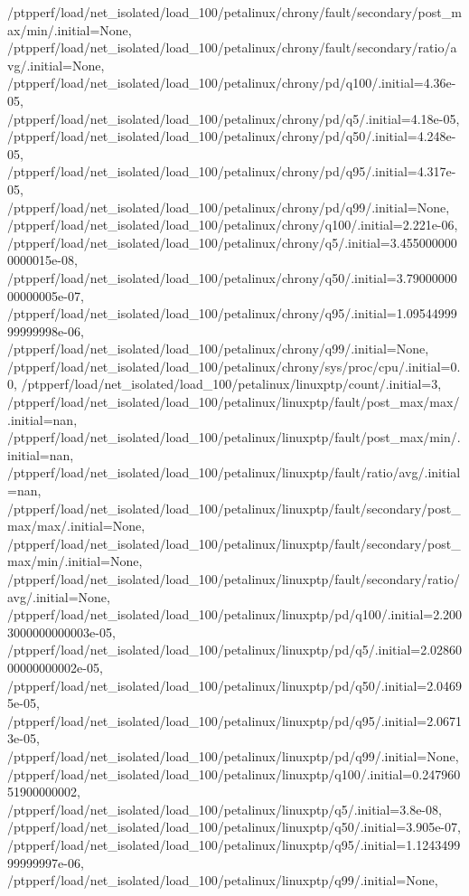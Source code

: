 {    /ptpperf/load/net_isolated/load_100/petalinux/chrony/fault/secondary/post_max/min/.initial=None,
    /ptpperf/load/net_isolated/load_100/petalinux/chrony/fault/secondary/ratio/avg/.initial=None,
    /ptpperf/load/net_isolated/load_100/petalinux/chrony/pd/q100/.initial=4.36e-05,
    /ptpperf/load/net_isolated/load_100/petalinux/chrony/pd/q5/.initial=4.18e-05,
    /ptpperf/load/net_isolated/load_100/petalinux/chrony/pd/q50/.initial=4.248e-05,
    /ptpperf/load/net_isolated/load_100/petalinux/chrony/pd/q95/.initial=4.317e-05,
    /ptpperf/load/net_isolated/load_100/petalinux/chrony/pd/q99/.initial=None,
    /ptpperf/load/net_isolated/load_100/petalinux/chrony/q100/.initial=2.221e-06,
    /ptpperf/load/net_isolated/load_100/petalinux/chrony/q5/.initial=3.4550000000000015e-08,
    /ptpperf/load/net_isolated/load_100/petalinux/chrony/q50/.initial=3.7900000000000005e-07,
    /ptpperf/load/net_isolated/load_100/petalinux/chrony/q95/.initial=1.0954499999999998e-06,
    /ptpperf/load/net_isolated/load_100/petalinux/chrony/q99/.initial=None,
    /ptpperf/load/net_isolated/load_100/petalinux/chrony/sys/proc/cpu/.initial=0.0,
    /ptpperf/load/net_isolated/load_100/petalinux/linuxptp/count/.initial=3,
    /ptpperf/load/net_isolated/load_100/petalinux/linuxptp/fault/post_max/max/.initial=nan,
    /ptpperf/load/net_isolated/load_100/petalinux/linuxptp/fault/post_max/min/.initial=nan,
    /ptpperf/load/net_isolated/load_100/petalinux/linuxptp/fault/ratio/avg/.initial=nan,
    /ptpperf/load/net_isolated/load_100/petalinux/linuxptp/fault/secondary/post_max/max/.initial=None,
    /ptpperf/load/net_isolated/load_100/petalinux/linuxptp/fault/secondary/post_max/min/.initial=None,
    /ptpperf/load/net_isolated/load_100/petalinux/linuxptp/fault/secondary/ratio/avg/.initial=None,
    /ptpperf/load/net_isolated/load_100/petalinux/linuxptp/pd/q100/.initial=2.2003000000000003e-05,
    /ptpperf/load/net_isolated/load_100/petalinux/linuxptp/pd/q5/.initial=2.0286000000000002e-05,
    /ptpperf/load/net_isolated/load_100/petalinux/linuxptp/pd/q50/.initial=2.04695e-05,
    /ptpperf/load/net_isolated/load_100/petalinux/linuxptp/pd/q95/.initial=2.06713e-05,
    /ptpperf/load/net_isolated/load_100/petalinux/linuxptp/pd/q99/.initial=None,
    /ptpperf/load/net_isolated/load_100/petalinux/linuxptp/q100/.initial=0.24796051900000002,
    /ptpperf/load/net_isolated/load_100/petalinux/linuxptp/q5/.initial=3.8e-08,
    /ptpperf/load/net_isolated/load_100/petalinux/linuxptp/q50/.initial=3.905e-07,
    /ptpperf/load/net_isolated/load_100/petalinux/linuxptp/q95/.initial=1.124349999999997e-06,
    /ptpperf/load/net_isolated/load_100/petalinux/linuxptp/q99/.initial=None,
}
